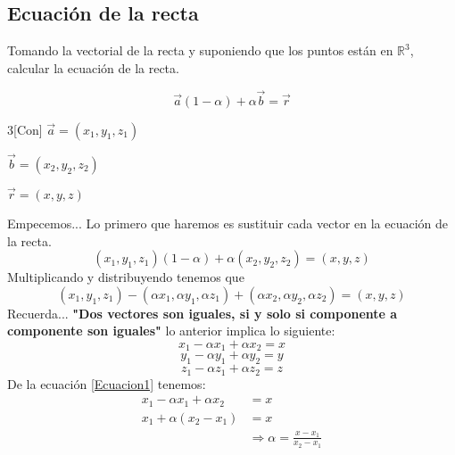 \documentclass[12pt,openany]{book}
\begin{document}
	    \subsection{Ecuaci\'on de la recta}

		    Tomando la vectorial de la recta y suponiendo que los puntos 
		    est\'an en $\mathbb{R}^3$, calcular la ecuaci\'on de la recta.
		    
		    $$ \vec{a} (1-\alpha)+ \alpha \vec{b} = \vec{r} $$
		  
		    \begin{multicols}{3}[Con]
		    $  \vec{a} = (x_{1}, y_{1}, z_{1}) $
	        \columnbreak
	        
		    $  \vec{b} = (x_{2}, y_{2}, z_{2})$
		   \columnbreak
		   
		   $   \vec{r} = (x, y, z)$
		    \end{multicols}
		    Empecemos... Lo primero que haremos es sustituir cada vector en 
		    la ecuaci\'on de la recta. 
		    $$
		    	(x_{1}, y_{1}, z_{1})(1-\alpha) + \alpha (x_{2}, y_{2}, z_{2}) = (x, y, z)
		    $$
	        Multiplicando y distribuyendo tenemos que
	        $$
	        	(x_{1}, y_{1}, z_{1})-(\alpha x_{1}, \alpha y_{1}, \alpha z_{1}) +
	        	(\alpha x_{2}, \alpha y_{2}, \alpha z_{2})= (x, y, z)
	        $$
	        Recuerda... \textbf{"Dos vectores son iguales, si y solo si componente a componente son iguales"} 
	        lo anterior implica lo siguiente:
	        \begin{equation}
	        	x_{1}- \alpha x_{1} + \alpha x_{2} = x
	        	\label{Ecuacion1} 
	        \end{equation}
	        \begin{equation}
	        	y_{1}- \alpha y_{1} + \alpha y_{2} = y
	        	\label{Ecuacion2}
	        \end{equation}
	        \begin{equation}
	        	z_{1}- \alpha z_{1} + \alpha z_{2} = z
	        	\label{Ecuacion3} 
	        \end{equation}        
	        De la ecuaci\'on \ref{Ecuacion1} tenemos:
	         \begin{equation*}
	         	\begin{split}
	        		x_{1}- \alpha x_{1} + \alpha x_{2} &= x 				\\
		      			  x_{1}+\alpha (x_{2} - x_{1}) &= x 				\\
		      			&\Rightarrow \alpha= \frac{x-x_{1}}{x_{2} - x_{1}}  \\
	        	\end{split}
	        \end{equation*}
\end{document}
